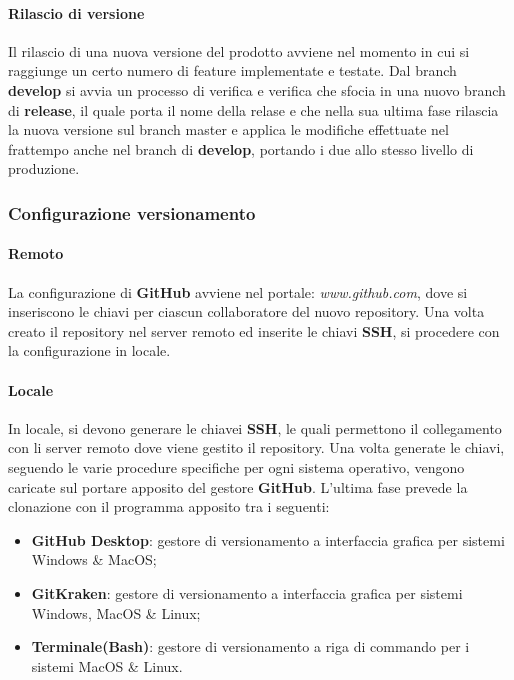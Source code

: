 \paragraph{Rilascio di versione}
Il rilascio di una nuova versione del prodotto avviene nel momento in cui si raggiunge un certo numero di feature implementate e testate. 
Dal branch \textbf{develop} si avvia un processo di verifica e verifica che sfocia in una nuovo branch di \textbf{release}, il quale porta il nome della relase e che nella sua ultima fase 
rilascia la nuova versione sul branch master e applica le modifiche effettuate nel frattempo anche nel branch di \textbf{develop}, portando i due allo stesso livello di produzione. 

\subsubsection{Configurazione versionamento}

\paragraph{Remoto}
	La configurazione di \textbf{GitHub} avviene nel portale: \textit{www.github.com}, dove si inseriscono le chiavi  per ciascun collaboratore del nuovo repository. 
	Una volta creato il repository nel server remoto ed inserite le chiavi \textbf{SSH}, si procedere con la configurazione in locale.
	
\paragraph{Locale}
	In locale, si devono generare le chiavei \textbf{SSH}, le quali permettono il collegamento con li server remoto dove viene gestito il repository. 
	Una volta generate le chiavi, seguendo le varie procedure specifiche per ogni sistema operativo, vengono caricate sul portare apposito del gestore \textbf{GitHub}.
	L'ultima fase prevede la clonazione con il programma apposito tra i seguenti: 

	\begin{itemize}
		\item \textbf{GitHub Desktop}: gestore di versionamento a interfaccia grafica per sistemi Windows \& MacOS; 
		\item \textbf{GitKraken}: gestore di versionamento a interfaccia grafica per sistemi Windows, MacOS \& Linux; 		
		\item \textbf{Terminale(Bash)}: gestore di versionamento a riga di commando per i sistemi MacOS \& Linux.
	\end{itemize}
		
